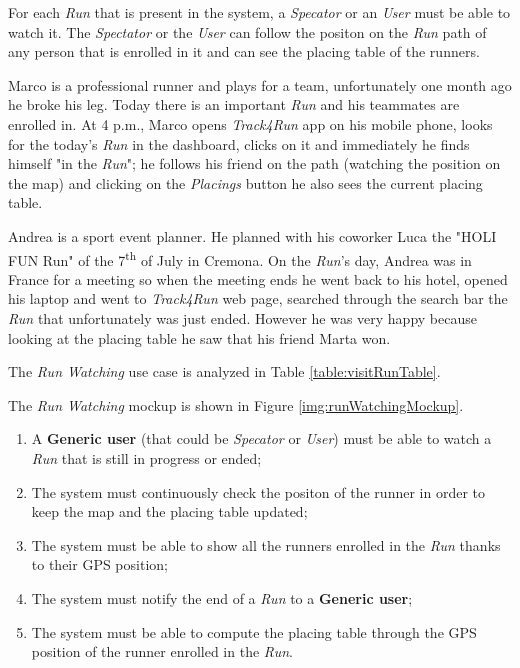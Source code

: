 For each \textit{Run} that is present in the system, a \textit{Specator} or an \textit{User} must be able to watch it.
The \textit{Spectator} or the \textit{User} can follow the positon on the \textit{Run} path of any person that is enrolled in it and can see the placing table of the runners.

Marco is a professional runner and plays for a team, unfortunately one month ago he broke his leg. Today there is an important \textit{Run} and his teammates are enrolled in. At 4 p.m., Marco opens \textit{Track4Run} app on his mobile phone, looks for the today's \textit{Run} in the dashboard, clicks on it and immediately he finds himself "in the \textit{Run}";
he follows his friend on the path (watching the position on the map) and clicking on the \textit{Placings} button he also sees the current placing table.

Andrea is a sport event planner. He planned with his coworker Luca the "HOLI FUN Run" of the 7\textsuperscript{th} of July in Cremona. On the \textit{Run}'s day, Andrea was in France for a meeting so when the meeting ends he went back to his hotel, opened his laptop and went to \textit{Track4Run} web page, searched through the search bar the \textit{Run} that unfortunately was just ended. However he was very happy because looking at the placing table he saw that his friend Marta won.

The \textit{Run Watching} use case is analyzed in Table \ref{table:visitRunTable}.

The \textit{Run Watching} mockup is shown in Figure \ref{img:runWatchingMockup}.

\begin{enumerate}
  \item A \textbf{Generic user} (that could be \textit{Specator} or \textit{User}) must be able to watch a \textit{Run} that is still in progress or ended;
  \item The system must continuously check the positon of the runner in order to keep the map and the placing table updated;
  \item The system must be able to show all the runners enrolled in the \textit{Run} thanks to their GPS position;
  \item The system must notify the end of a \textit{Run} to a \textbf{Generic user};
  \item The system must be able to compute the placing table through the GPS position of the runner enrolled in the \textit{Run}.
\end{enumerate}

